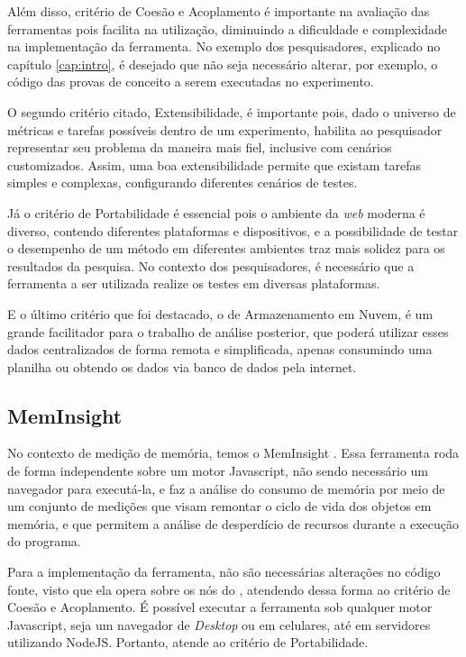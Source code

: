 \documentclass[12pt]{tcc}
\begin{document}
	Além disso, critério de Coesão e Acoplamento é importante na avaliação das ferramentas pois facilita na utilização, diminuindo a dificuldade e complexidade na implementação da ferramenta. No exemplo dos pesquisadores, explicado no capítulo \ref{cap:intro}, é desejado que não seja necessário alterar, por exemplo, o código das provas de conceito a serem executadas no experimento. 
	
	O segundo critério citado, Extensibilidade, é importante pois, dado o universo de métricas e tarefas possíveis dentro de um experimento, habilita ao pesquisador representar seu problema da maneira mais fiel, inclusive com cenários customizados. Assim, uma boa extensibilidade permite que existam tarefas simples e complexas, configurando diferentes cenários de testes.
	
	Já o critério de Portabilidade é essencial pois o ambiente da \emph{web} moderna é diverso, contendo diferentes plataformas e dispositivos, e a possibilidade de testar o desempenho de um método em diferentes ambientes traz mais solidez para os resultados da pesquisa. No contexto dos pesquisadores, é necessário que a ferramenta a ser utilizada realize os testes em diversas plataformas.
	
	E o último critério que foi destacado, o de Armazenamento em Nuvem, é um grande facilitador para o trabalho de análise posterior, que poderá utilizar esses dados centralizados de forma remota e simplificada, apenas consumindo uma planilha ou obtendo os dados via banco de dados pela internet.

	\subsection{MemInsight}
	\label{subsection:meminsight}

	No contexto de medição de memória, temos o MemInsight \citep{Jensen2015MemInsight}. Essa ferramenta roda de forma independente sobre um motor Javascript, não sendo necessário um navegador para executá-la, e faz a análise do consumo de memória por meio de um conjunto de medições que visam remontar o ciclo de vida dos objetos em memória, e que permitem a análise de desperdício de recursos durante a execução do programa. 

	Para a implementação da ferramenta, não são necessárias alterações no código fonte, visto que ela opera sobre os nós do , atendendo dessa forma ao critério de Coesão e Acoplamento. É possível executar a ferramenta sob qualquer motor Javascript, seja um navegador de \emph{Desktop} ou em celulares, até em servidores utilizando NodeJS. Portanto, atende ao critério de Portabilidade.
\end{document}
